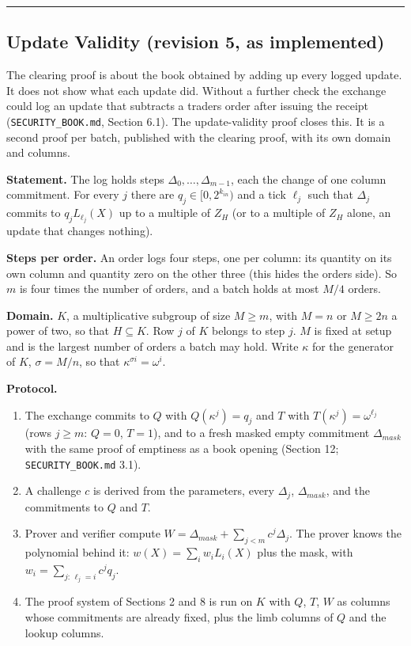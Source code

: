 \begin{center}\rule{0.5\linewidth}{0.5pt}\end{center}

\subsection{Update Validity (revision 5, as implemented)}

The clearing proof is about the book obtained by adding up every logged update. It does not show what each update did. Without a further check the exchange could log an update that subtracts a trader\textquotesingle s order after issuing the receipt (\texttt{SECURITY\_BOOK.md}, Section 6.1). The update-validity proof closes this. It is a second proof per batch, published with the clearing proof, with its own domain and columns.

\textbf{Statement.} The log holds steps \(\Delta_0, \ldots, \Delta_{m-1}\), each the change of one column commitment. For every \(j\) there are \(q_j \in [0, 2^{k_{in}})\) and a tick \(\ell_j\) such that \(\Delta_j\) commits to \(q_j L_{\ell_j}(X)\) up to a multiple of \(Z_H\) (or to a multiple of \(Z_H\) alone, an update that changes nothing).

\textbf{Steps per order.} An order logs four steps, one per column: its quantity on its own column and quantity zero on the other three (this hides the order\textquotesingle s side). So \(m\) is four times the number of orders, and a batch holds at most \(M/4\) orders.

\textbf{Domain.} \(K\), a multiplicative subgroup of size \(M \ge m\), with \(M = n\) or \(M \ge 2n\) a power of two, so that \(H \subseteq K\). Row \(j\) of \(K\) belongs to step \(j\). \(M\) is fixed at setup and is the largest number of orders a batch may hold. Write \(\kappa\) for the generator of \(K\), \(\sigma = M/n\), so that \(\kappa^{\sigma i} = \omega^i\).

\textbf{Protocol.}

\begin{enumerate}
\def\labelenumi{\arabic{enumi}.}
\item
  The exchange commits to \(Q\) with \(Q(\kappa^j) = q_j\) and \(T\) with \(T(\kappa^j) = \omega^{\ell_j}\) (rows \(j \ge m\): \(Q = 0\), \(T = 1\)), and to a fresh masked empty commitment \(\Delta_{mask}\) with the same proof of emptiness as a book opening (Section 12; \texttt{SECURITY\_BOOK.md} 3.1).
\item
  A challenge \(c\) is derived from the parameters, every \(\Delta_j\), \(\Delta_{mask}\), and the commitments to \(Q\) and \(T\).
\item
  Prover and verifier compute \(W = \Delta_{mask} + \sum_{j<m} c^j \Delta_j\). The prover knows the polynomial behind it: \(w(X) = \sum_i w_i L_i(X)\) plus the mask, with \(w_i = \sum_{j:\, \ell_j = i} c^j q_j\).
\item
  The proof system of Sections 2 and 8 is run on \(K\) with \(Q\), \(T\), \(W\) as columns whose commitments are already fixed, plus the limb columns of \(Q\) and the lookup columns.
\end{enumerate}

